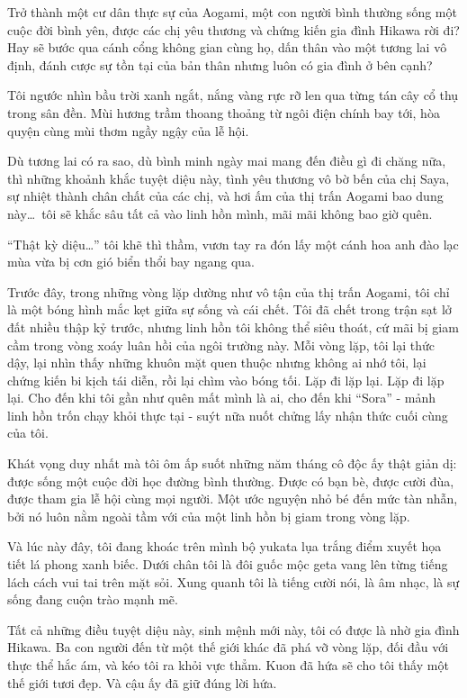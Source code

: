 \documentclass[../main.tex]{subfiles}
\begin{document}
Trở thành một cư dân thực sự của Aogami, một con người bình thường sống một cuộc đời bình yên, được các chị yêu thương và chứng kiến gia đình Hikawa rời đi? Hay sẽ bước qua cánh cổng không gian cùng họ, dấn thân vào một tương lai vô định, đánh cược sự tồn tại của bản thân nhưng luôn có gia đình ở bên cạnh?

Tôi ngước nhìn bầu trời xanh ngắt, nắng vàng rực rỡ len qua từng tán cây cổ thụ trong sân đền. Mùi hương trầm thoang thoảng từ ngôi điện chính bay tới, hòa quyện cùng mùi thơm ngầy ngậy của lễ hội.

Dù tương lai có ra sao, dù bình minh ngày mai mang đến điều gì đi chăng nữa, thì những khoảnh khắc tuyệt diệu này, tình yêu thương vô bờ bến của chị Saya, sự nhiệt thành chân chất của các chị, và hơi ấm của thị trấn Aogami bao dung này\dots\ tôi sẽ khắc sâu tất cả vào linh hồn mình, mãi mãi không bao giờ quên.


``Thật kỳ diệu\dots'' tôi khẽ thì thầm, vươn tay ra đón lấy một cánh hoa anh đào lạc mùa vừa bị cơn gió biển thổi bay ngang qua.

Trước đây, trong những vòng lặp dường như vô tận của thị trấn Aogami, tôi chỉ là một bóng hình mắc kẹt giữa sự sống và cái chết. Tôi đã chết trong trận sạt lở đất nhiều thập kỷ trước, nhưng linh hồn tôi không thể siêu thoát, cứ mãi bị giam cầm trong vòng xoáy luân hồi của ngôi trường này. Mỗi vòng lặp, tôi lại thức dậy, lại nhìn thấy những khuôn mặt quen thuộc nhưng không ai nhớ tôi, lại chứng kiến bi kịch tái diễn, rồi lại chìm vào bóng tối. Lặp đi lặp lại. Lặp đi lặp lại. Cho đến khi tôi gần như quên mất mình là ai, cho đến khi ``Sora'' - mảnh linh hồn trốn chạy khỏi thực tại - suýt nữa nuốt chửng lấy nhận thức cuối cùng của tôi.

Khát vọng duy nhất mà tôi ôm ấp suốt những năm tháng cô độc ấy thật giản dị: được sống một cuộc đời học đường bình thường. Được có bạn bè, được cười đùa, được tham gia lễ hội cùng mọi người. Một ước nguyện nhỏ bé đến mức tàn nhẫn, bởi nó luôn nằm ngoài tầm với của một linh hồn bị giam trong vòng lặp.

Và lúc này đây, tôi đang khoác trên mình bộ yukata lụa trắng điểm xuyết họa tiết lá phong xanh biếc. Dưới chân tôi là đôi guốc mộc geta vang lên từng tiếng lách cách vui tai trên mặt sỏi. Xung quanh tôi là tiếng cười nói, là âm nhạc, là sự sống đang cuộn trào mạnh mẽ.

Tất cả những điều tuyệt diệu này, sinh mệnh mới này, tôi có được là nhờ gia đình Hikawa. Ba con người đến từ một thế giới khác đã phá vỡ vòng lặp, đối đầu với thực thể hắc ám, và kéo tôi ra khỏi vực thẳm. Kuon đã hứa sẽ cho tôi thấy một thế giới tươi đẹp. Và cậu ấy đã giữ đúng lời hứa.
\end{document}
